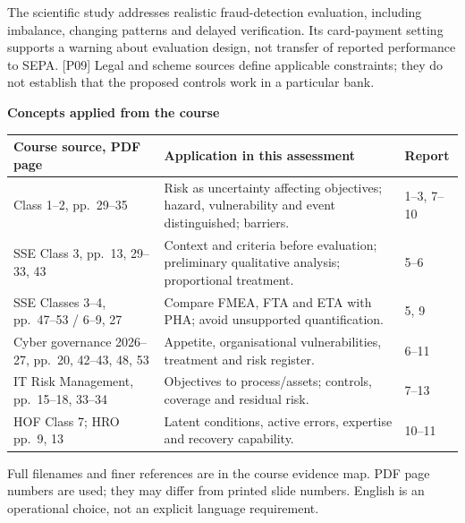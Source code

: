 \documentclass[11pt,a4paper]{article}
\newcommand{\sub}[1]{\par\vspace{2mm}\textbf{\color{ink}#1}\par}
\newcommand{\src}[1]{{\small[#1]}}
\begin{document}
The scientific study addresses realistic fraud-detection evaluation, including imbalance, changing patterns and delayed verification. Its card-payment setting supports a warning about evaluation design, not transfer of reported performance to SEPA. \src{P09} Legal and scheme sources define applicable constraints; they do not establish that the proposed controls work in a particular bank.
\sub{Concepts applied from the course}
\par{\small\begin{tabularx}{\textwidth}{@{}P{38mm}YP{20mm}@{}}\toprule
Course source, PDF page & Application in this assessment & Report\\\midrule
Class 1--2, pp.~29--35 & Risk as uncertainty affecting objectives; hazard, vulnerability and event distinguished; barriers. & 1--3, 7--10\\
SSE Class 3, pp.~13, 29--33, 43 & Context and criteria before evaluation; preliminary qualitative analysis; proportional treatment. & 5--6\\
SSE Classes 3--4, pp.~47--53 / 6--9, 27 & Compare FMEA, FTA and ETA with PHA; avoid unsupported quantification. & 5, 9\\
Cyber governance 2026--27, pp.~20, 42--43, 48, 53 & Appetite, organisational vulnerabilities, treatment and risk register. & 6--11\\
IT Risk Management, pp.~15--18, 33--34 & Objectives to process/assets; controls, coverage and residual risk. & 7--13\\
HOF Class 7; HRO pp.~9, 13 & Latent conditions, active errors, expertise and recovery capability. & 10--11\\\bottomrule
\end{tabularx}\par}
{\small Full filenames and finer references are in the course evidence map. PDF page numbers are used; they may differ from printed slide numbers. English is an operational choice, not an explicit language requirement.\par}
\end{document}
